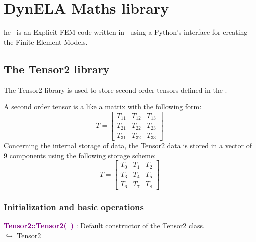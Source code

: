 %
%
%
\chapter{DynELA Maths library}

\startcontents[chapters]
\printmyminitoc[2]he \DynELA~is an Explicit FEM code written in \Cpp~using a Python's interface for creating the Finite Element Models. 

\section{The Tensor2 library}

The Tensor2 library is used to store second order tensors defined in the \DynELA.

A second order tensor is a like a matrix with the following form:
\begin{equation}
T=\left[\begin{array}{ccc}
  T_{11} & T_{12} & T_{13}\\
  T_{21} & T_{22} & T_{23}\\
  T_{31} & T_{32} & T_{33}
  \end{array}\right]
\end{equation}
Concerning the internal storage of data, the Tensor2 data is stored in a vector of 9 components using the following storage scheme:
\begin{equation}
T=\left[\begin{array}{ccc}
    T_{0} & T_{1} & T_{2}\\
    T_{3} & T_{4} & T_{5}\\
    T_{6} & T_{7} & T_{8}
    \end{array}\right]
\end{equation}

\subsection{Initialization and basic operations}
\textcolor{purple}{\textbf{Tensor2::Tensor2(~)}}\label{Tensor2::Tensor2()} : Default constructor of the Tensor2 class.\\ \hspace*{5mm}$\hookrightarrow$ Tensor2

